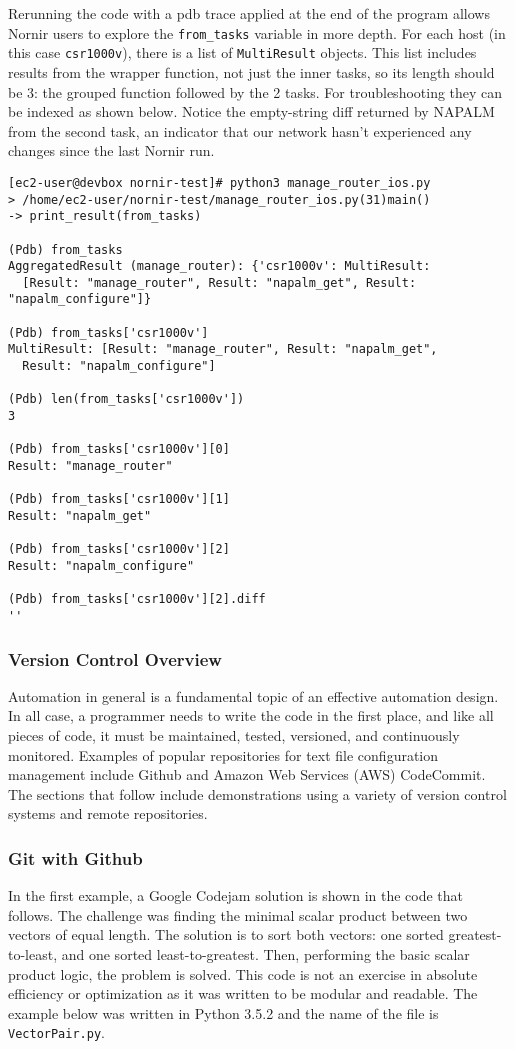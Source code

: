Rerunning the code with a pdb trace applied at the end of the program allows
Nornir users to explore the \verb|from_tasks| variable in more depth. For each
host (in this case \verb|csr1000v|), there is a list of \verb|MultiResult| objects.
This list includes results from the wrapper function, not just the inner tasks, so
its length should be 3: the grouped function followed by the 2 tasks. For
troubleshooting they can be indexed as shown below. Notice the empty-string
diff returned by NAPALM from the second task, an indicator that our network
hasn't experienced any changes since the last Nornir run.

\begin{verbatim}
[ec2-user@devbox nornir-test]# python3 manage_router_ios.py
> /home/ec2-user/nornir-test/manage_router_ios.py(31)main()
-> print_result(from_tasks)

(Pdb) from_tasks
AggregatedResult (manage_router): {'csr1000v': MultiResult:
  [Result: "manage_router", Result: "napalm_get", Result: "napalm_configure"]}

(Pdb) from_tasks['csr1000v']
MultiResult: [Result: "manage_router", Result: "napalm_get",
  Result: "napalm_configure"]

(Pdb) len(from_tasks['csr1000v'])
3

(Pdb) from_tasks['csr1000v'][0]
Result: "manage_router"

(Pdb) from_tasks['csr1000v'][1]
Result: "napalm_get"

(Pdb) from_tasks['csr1000v'][2]
Result: "napalm_configure"

(Pdb) from_tasks['csr1000v'][2].diff
''
\end{verbatim}

\subsubsection{Version Control Overview}
Automation in general is a fundamental topic of an effective automation
design. In all case, a programmer needs to write the code in the first
place, and like all pieces of code, it must be maintained, tested, versioned,
and continuously monitored. Examples of popular repositories for text file
configuration management include Github and Amazon Web Services (AWS) CodeCommit.
The sections that follow include demonstrations using a variety of version
control systems and remote repositories.

\subsubsection{Git with Github}
In the first example, a Google Codejam solution is shown in the code that
follows. The challenge was finding the minimal scalar product between two
vectors of equal length. The solution is to sort both vectors: one sorted
greatest-to-least, and one sorted least-to-greatest. Then, performing the
basic scalar product logic, the problem is solved. This code is not an
exercise in absolute efficiency or optimization as it was written to be
modular and readable. The example below was written in Python 3.5.2 and
the name of the file is \verb|VectorPair.py|.

